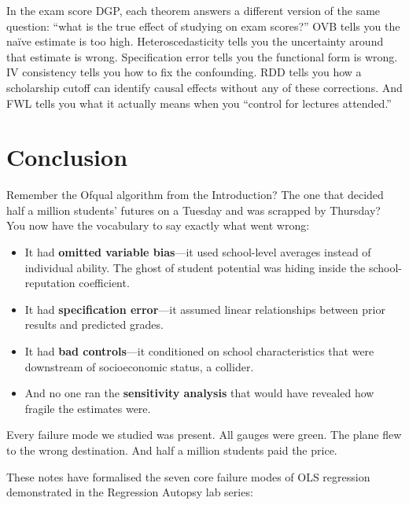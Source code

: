 \documentclass[11pt,a4paper]{article}
\theoremstyle{definition}
\theoremstyle{plain}
\theoremstyle{remark}
\begin{document}
In the exam score DGP, each theorem answers a different version of the same question: ``what is the true effect of studying on exam scores?'' OVB tells you the na\"ive estimate is too high. Heteroscedasticity tells you the uncertainty around that estimate is wrong. Specification error tells you the functional form is wrong. IV consistency tells you how to fix the confounding. RDD tells you how a scholarship cutoff can identify causal effects without any of these corrections. And FWL tells you what it actually means when you ``control for lectures attended.''

\section{Conclusion}\label{sec:conclusion}

Remember the Ofqual algorithm from the Introduction? The one that decided half a million students' futures on a Tuesday and was scrapped by Thursday? You now have the vocabulary to say exactly what went wrong:
\begin{itemize}[nosep]
  \item It had \textbf{omitted variable bias}---it used school-level averages instead of individual ability. The ghost of student potential was hiding inside the school-reputation coefficient.
  \item It had \textbf{specification error}---it assumed linear relationships between prior results and predicted grades.
  \item It had \textbf{bad controls}---it conditioned on school characteristics that were downstream of socioeconomic status, a collider.
  \item And no one ran the \textbf{sensitivity analysis} that would have revealed how fragile the estimates were.
\end{itemize}
Every failure mode we studied was present. All gauges were green. The plane flew to the wrong destination. And half a million students paid the price.

\medskip
These notes have formalised the seven core failure modes of OLS regression demonstrated in the Regression Autopsy lab series:
\end{document}
